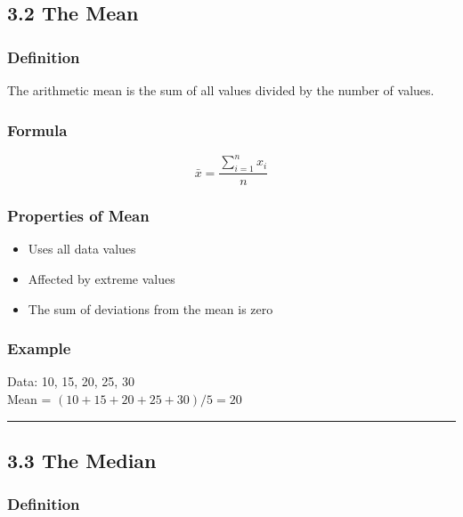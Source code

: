 \documentclass[
  letterpaper,
  DIV=11,
  numbers=noendperiod]{scrreprt}
\providecommand{\tightlist}{%
  \setlength{\itemsep}{0pt}\setlength{\parskip}{0pt}}
\begin{document}
\subsection{3.2 The Mean}\label{the-mean}

\subsubsection{Definition}\label{definition}

The arithmetic mean is the sum of all values divided by the number of
values.

\subsubsection{Formula}\label{formula}

\[
\bar{x} = \frac{\sum_{i=1}^{n} x_i}{n}
\]

\subsubsection{Properties of Mean}\label{properties-of-mean}

\begin{itemize}
\tightlist
\item
  Uses all data values
\item
  Affected by extreme values
\item
  The sum of deviations from the mean is zero
\end{itemize}

\subsubsection{Example}\label{example}

Data: 10, 15, 20, 25, 30\\
Mean = \((10 + 15 + 20 + 25 + 30)/5 = 20\)

\begin{center}\rule{0.5\linewidth}{0.5pt}\end{center}

\subsection{3.3 The Median}\label{the-median}

\subsubsection{Definition}\label{definition-1}
\end{document}
